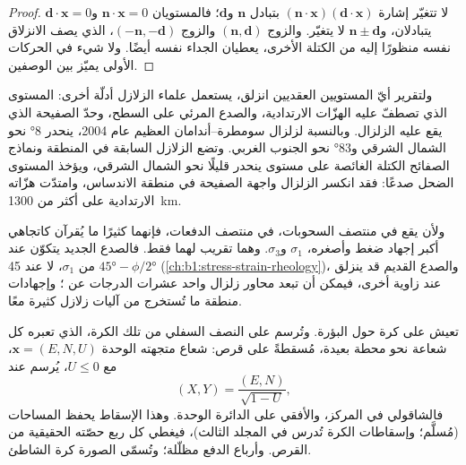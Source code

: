 \begin{proof}
لا تتغيّر إشارة $(\mathbf n\cdot\mathbf x)(\mathbf d\cdot\mathbf x)$ بتبادل $\mathbf n$ و$\mathbf d$؛ فالمستويان $\mathbf n\cdot\mathbf x = 0$ و$\mathbf d\cdot\mathbf x = 0$ يتبادلان، و$\mathbf n \pm \mathbf d$ لا يتغيّر. والزوج $(\mathbf n, \mathbf d)$ والزوج $(-\mathbf n, -\mathbf d)$، الذي يصف الانزلاق نفسه منظورًا إليه من الكتلة الأخرى، يعطيان الجداء نفسه أيضًا. ولا شيء في الحركات الأولى يميّز بين الوصفين.
\end{proof}

ولتقرير أيّ المستويين العقديين انزلق، يستعمل علماء الزلازل أدلّة أخرى: المستوى الذي تصطفّ عليه الهزّات الارتدادية، والصدع المرئي على السطح، وحدّ الصفيحة الذي يقع عليه الزلزال. وبالنسبة لزلزال سومطرة--أندامان العظيم عام 2004، ينحدر  \ang{8} نحو الشمال الشرقي و\ang{83} نحو الجنوب الغربي. وتضع الزلازل السابقة في المنطقة ونماذج الصفائح الكتلة الغائصة على مستوى ينحدر قليلًا نحو الشمال الشرقي، ويؤخذ المستوى الضحل صدعًا: فقد انكسر الزلزال واجهة الصفيحة في منطقة الاندساس، وامتدّت هزّاته الارتدادية على أكثر من \qty{1300}{km}.

ولأن  يقع في منتصف السحوبات،  في منتصف الدفعات، فإنهما كثيرًا ما يُقرآن كاتجاهي أكبر إجهاد ضغط وأصغره، $\sigma_1$ و$\sigma_3$. وهما تقريب لهما فقط. فالصدع الجديد يتكوّن عند $\ang{45} - \phi/2$ من $\sigma_1$، لا عند \ang{45} (\cref{ch:b1:stress-strain-rheology})، والصدع القديم قد ينزلق عند زاوية أخرى، فيمكن أن تبعد محاور زلزال واحد عشرات الدرجات عن ؛ وإجهادات منطقة ما تُستخرج من آليات زلازل كثيرة معًا.

تعيش  على كرة حول البؤرة. وتُرسم على النصف السفلي من تلك الكرة، الذي تعبره كل شعاعة نحو محطة بعيدة، مُسقطةً على قرص: شعاع متجهته الوحدة $\mathbf x = (E, N, U)$، مع $U \le 0$، يُرسم عند
\[
  (X, Y) = \frac{(E, N)}{\sqrt{1 - U}} ,
\]
فالشاقولي في المركز، والأفقي على الدائرة الوحدة. وهذا الإسقاط يحفظ المساحات (مُسلَّم؛ وإسقاطات الكرة تُدرس في المجلد الثالث)، فيغطي كل ربع حصّته الحقيقية من القرص. وأرباع الدفع مظلّلة؛ وتُسمّى الصورة كرة الشاطئ.

